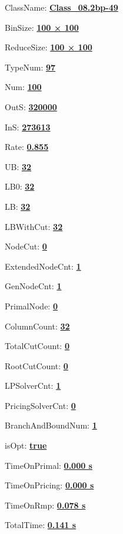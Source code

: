 \documentclass[11pt]{article}
\begin{document}
\pagestyle{empty}


ClassName: \underline{\textbf{Class_08.2bp-49}}
\par
BinSize: \underline{\textbf{100 × 100}}
\par
ReduceSize: \underline{\textbf{100 × 100}}
\par
TypeNum: \underline{\textbf{97}}
\par
Num: \underline{\textbf{100}}
\par
OutS: \underline{\textbf{320000}}
\par
InS: \underline{\textbf{273613}}
\par
Rate: \underline{\textbf{0.855}}
\par
UB: \underline{\textbf{32}}
\par
LB0: \underline{\textbf{32}}
\par
LB: \underline{\textbf{32}}
\par
LBWithCut: \underline{\textbf{32}}
\par
NodeCut: \underline{\textbf{0}}
\par
ExtendedNodeCnt: \underline{\textbf{1}}
\par
GenNodeCnt: \underline{\textbf{1}}
\par
PrimalNode: \underline{\textbf{0}}
\par
ColumnCount: \underline{\textbf{32}}
\par
TotalCutCount: \underline{\textbf{0}}
\par
RootCutCount: \underline{\textbf{0}}
\par
LPSolverCnt: \underline{\textbf{1}}
\par
PricingSolverCnt: \underline{\textbf{0}}
\par
BranchAndBoundNum: \underline{\textbf{1}}
\par
isOpt: \underline{\textbf{true}}
\par
TimeOnPrimal: \underline{\textbf{0.000 s}}
\par
TimeOnPricing: \underline{\textbf{0.000 s}}
\par
TimeOnRmp: \underline{\textbf{0.078 s}}
\par
TotalTime: \underline{\textbf{0.141 s}}
\par
\newpage


\end{document}
